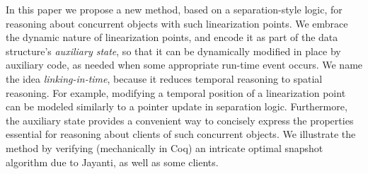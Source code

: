 In this paper we propose a new method, based on a separation-style
logic, for reasoning about concurrent objects with such linearization
points. We embrace the dynamic nature of linearization points, and
encode it as part of the data structure's \emph{auxiliary state}, so
that it can be dynamically modified in place by auxiliary code, as
needed when some appropriate run-time event occurs.
%
We name the idea \emph{linking-in-time}, because it reduces temporal
reasoning to spatial reasoning. For example, modifying a temporal
position of a linearization point can be modeled similarly to a
pointer update in separation logic.
%
Furthermore, the auxiliary state provides a convenient way to
concisely express the properties essential for reasoning about clients
of such concurrent objects.
%
%
%
%
We illustrate the method by verifying (mechanically in Coq) an
intricate optimal snapshot algorithm due to Jayanti, as well as some
clients.


